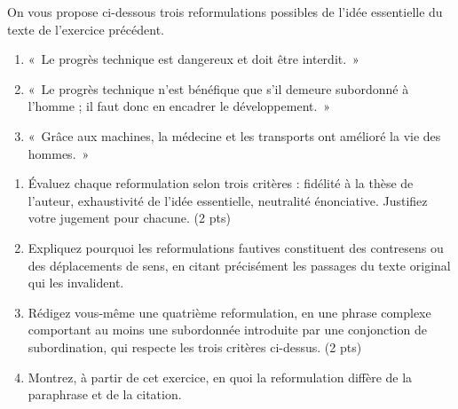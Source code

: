 \documentclass[11pt]{article}
\begin{document}
\begin{exercice}
On vous propose ci-dessous trois reformulations possibles de l'idée essentielle du texte de l'exercice précédent.

\begin{enumerate}
\item[a.] «~Le progrès technique est dangereux et doit être interdit.~»
\item[b.] «~Le progrès technique n'est bénéfique que s'il demeure subordonné à l'homme ; il faut donc en encadrer le développement.~»
\item[c.] «~Grâce aux machines, la médecine et les transports ont amélioré la vie des hommes.~»
\end{enumerate}

\begin{enumerate}
\item Évaluez chaque reformulation selon trois critères : fidélité à la thèse de l'auteur, exhaustivité de l'idée essentielle, neutralité énonciative. Justifiez votre jugement pour chacune. (2 pts)
\item Expliquez pourquoi les reformulations fautives constituent des contresens ou des déplacements de sens, en citant précisément les passages du texte original qui les invalident.
\item Rédigez vous-même une quatrième reformulation, en une phrase complexe comportant au moins une subordonnée introduite par une conjonction de subordination, qui respecte les trois critères ci-dessus. (2 pts)
\item Montrez, à partir de cet exercice, en quoi la reformulation diffère de la paraphrase et de la citation.
\end{enumerate}
\end{exercice}
\end{document}
